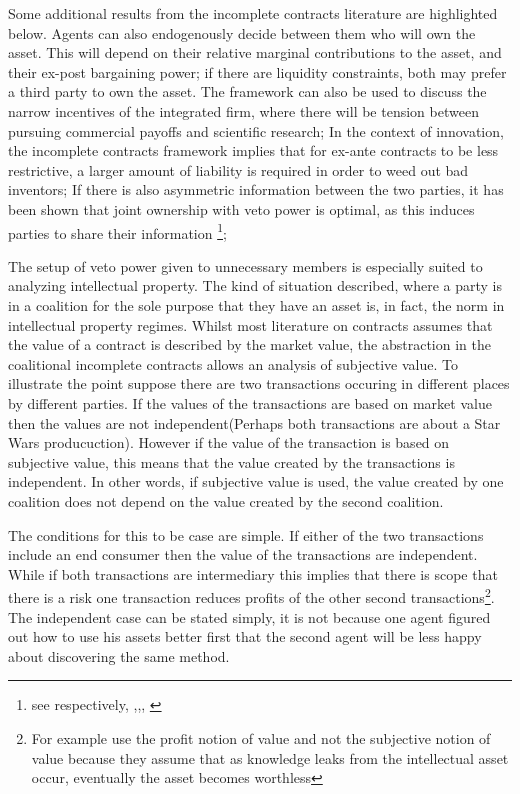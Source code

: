 \documentclass[12pt]{report}
\numberwithin{equation}{section}
\begin{document}
Some additional results from the incomplete contracts literature are highlighted below. Agents can also endogenously decide between them who will own the asset. This will depend on their relative marginal contributions to the asset, and their ex-post bargaining power; if there are liquidity constraints, both may prefer a third party to own the asset. The framework can also be used to discuss the narrow incentives of the integrated firm, where there will be tension between pursuing commercial payoffs and scientific research; In the context of innovation, the incomplete contracts framework implies that for ex-ante contracts to be less restrictive, a larger amount of liability is required in order to weed out bad inventors; If there is also asymmetric information between the two parties, it has been shown that joint ownership with veto power is optimal, as this induces parties to share their information \footnote{see respectively, \cite{Aghion1994},\citep{lerner2010contractibility},\citep{anton1994expropriation}, \citep{Rosenkranz1999}};

The setup of veto power given to unnecessary members is especially suited to analyzing intellectual property. The kind of situation described, where a party is in a coalition for the sole purpose that they have an asset is, in fact, the norm in intellectual property regimes. Whilst most literature on contracts assumes that the value of a contract is described by the market value, the abstraction in the coalitional incomplete contracts allows an analysis of subjective value. To illustrate the point suppose there are two transactions occuring in different places by different parties. If the values of the transactions are based on market value then the values are not independent(Perhaps both transactions are about a Star Wars producuction). However if the value of the transaction is based on subjective value, this means that the value created by the transactions is independent. In other words, if subjective value is used, the value created by one coalition does not depend on the value created by the second coalition. 

The conditions for this to be case are simple. If either of the two transactions include an end consumer then the value of the transactions are independent. While if both transactions are intermediary this implies that there is scope that there is a risk one transaction reduces profits of the other second transactions\footnote{ For example \cite{anton1994expropriation} use the profit notion of value and not the subjective notion of value because they assume that as knowledge leaks from the intellectual asset occur, eventually the asset becomes worthless}. The independent case can be stated simply, it is not because one agent figured out how to use his assets better first that the second agent will be less happy about discovering the same method. 
\end{document}
